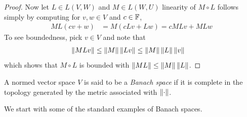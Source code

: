 \begin{proof}
Now let $L \in  L(V,W)$ and $M \in L(W, U)$ linearity of $M \circ L$
follows simply by computing for $v,w \in V$ and $c \in \mathbb{F}$,
\begin{align*}
  ML (cv + w) &= M( cLv + Lw) = cMLv + MLw 
\end{align*}
To see boundedness, pick $v \in V$ and
note that
\begin{align*}
  \left \lVert M Lv \right \rVert &\leq
                 \left \lVert M \right \rVert\left \lVert Lv \right \rVert \leq \left \lVert M \right \rVert\left \lVert L \right \rVert\left \lVert v \right \rVert
\end{align*}
which shows that $M \circ L$ is bounded with $\left \lVert ML \right \rVert \leq \left \lVert M \right \rVert\left \lVert L \right \rVert$.
\end{proof}

\begin{defn}A normed vector space $V$ is said to be a \emph{Banach space} if it is complete in the topology generated by the metric associated with $\left \lVert \cdot \right \rVert$.
\end{defn}
We start with some of the standard examples of Banach spaces.

